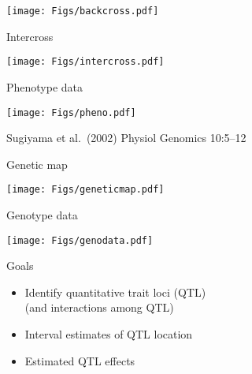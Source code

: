 \documentclass[12pt]{article}
\newcommand{\headsize}{\fontsize{35}{35} \selectfont}
\newcommand{\smallsize}{\fontsize{25}{30} \selectfont}
\newcommand{\smallestsize}{\fontsize{18}{22} \selectfont}
\begin{document}
\vfill

\centerline{\texttt{[image: Figs/backcross.pdf]}}

\newpage

\headsize \color{myyellow}
\hfill \begin{minipage}{5.75in}
\centering
Intercross
\end{minipage}

\vfill

\centerline{\texttt{[image: Figs/intercross.pdf]}}

\newpage

\headsize \color{myyellow}
\hfill \begin{minipage}{5.75in}
\centering
Phenotype data
\end{minipage}

\vspace{30mm}

\centerline{\texttt{[image: Figs/pheno.pdf]}}

\vfill
\smallestsize
\color{myblue}
Sugiyama et al.\ (2002) Physiol Genomics 10:5--12


\newpage

\headsize \color{myyellow}
\hfill \begin{minipage}{5.75in}
\centering
Genetic map
\end{minipage}

\vfill

\centerline{\texttt{[image: Figs/geneticmap.pdf]}}

\newpage

\headsize \color{myyellow}
\hfill \begin{minipage}{5.75in}
\centering
Genotype data
\end{minipage}

\vfill

\centerline{\texttt{[image: Figs/genodata.pdf]}}


\newpage

\headsize \color{myyellow}
\hfill \begin{minipage}{5.75in}
\centering
Goals
\end{minipage}

\vspace{3cm}

\color{mywhite} \smallsize

\hfill \begin{minipage}[t]{9.5in}
\begin{itemize}
\itemsep24pt
\item Identify quantitative trait loci (QTL)\\[6pt]
   {\color{myblue}   (and interactions among QTL)}
\item Interval estimates of QTL location
\item Estimated QTL effects
\end{itemize} \end{minipage}
\end{document}
